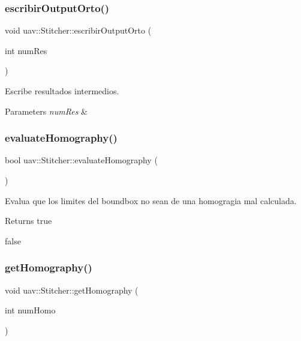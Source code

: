 \subsubsection{\texorpdfstring{escribir\+Output\+Orto()}{escribirOutputOrto()}}
{\footnotesize\ttfamily void uav\+::\+Stitcher\+::escribir\+Output\+Orto (\begin{DoxyParamCaption}\item[{int}]{num\+Res }\end{DoxyParamCaption})\hspace{0.3cm}{\ttfamily [inline]}}



Escribe resultados intermedios. 


\begin{DoxyParams}{Parameters}
{\em num\+Res} & \\
\hline
\end{DoxyParams}
\mbox{\label{classuav_1_1Stitcher_a90039daf32275b9b9a4d7820e7a6a929}} 
\subsubsection{\texorpdfstring{evaluate\+Homography()}{evaluateHomography()}}
{\footnotesize\ttfamily bool uav\+::\+Stitcher\+::evaluate\+Homography (\begin{DoxyParamCaption}{ }\end{DoxyParamCaption})\hspace{0.3cm}{\ttfamily [inline]}}



Evalua que los limites del boundbox no sean de una homogragia mal calculada. 

\begin{DoxyReturn}{Returns}
true 

false 
\end{DoxyReturn}
\mbox{\label{classuav_1_1Stitcher_aafe09514806435e6258d8740b9f6c122}} 
\subsubsection{\texorpdfstring{get\+Homography()}{getHomography()}}
{\footnotesize\ttfamily void uav\+::\+Stitcher\+::get\+Homography (\begin{DoxyParamCaption}\item[{int}]{num\+Homo }\end{DoxyParamCaption})\hspace{0.3cm}{\ttfamily [inline]}}




